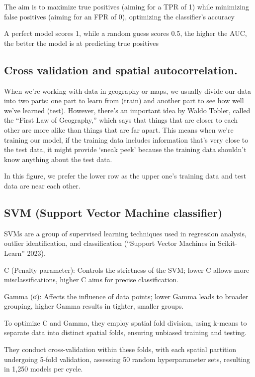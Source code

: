 \documentclass[
  letterpaper,
  DIV=11,
  numbers=noendperiod]{scrreprt}
\begin{document}
The aim is to maximize true positives (aiming for a TPR of 1) while
minimizing false positives (aiming for an FPR of 0), optimizing the
classifier's accuracy

A perfect model scores 1, while a random guess scores 0.5, the higher
the AUC, the better the model is at predicting true positives

\subsection{Cross validation and spatial
autocorrelation.}\label{cross-validation-and-spatial-autocorrelation.}

When we're working with data in geography or maps, we usually divide our
data into two parts: one part to learn from (train) and another part to
see how well we've learned (test). However, there's an important idea by
Waldo Tobler, called the ``First Law of Geography,'' which says that
things that are closer to each other are more alike than things that are
far apart. This means when we're training our model, if the training
data includes information that's very close to the test data, it might
provide `sneak peek' because the training data shouldn't know anything
about the test data.

In this figure, we prefer the lower row as the upper one's training data
and test data are near each other.

\subsection{SVM (Support Vector Machine
classifier)}\label{svm-support-vector-machine-classifier}

SVMs are a group of supervised learning techniques used in regression
analysis, outlier identification, and classification ({``Support Vector
Machines in Scikit-Learn''} 2023).~

C (Penalty parameter): Controls the strictness of the SVM; lower C
allows more misclassifications, higher C aims for precise
classification.

Gamma (σ): Affects the influence of data points; lower Gamma leads to
broader grouping, higher Gamma results in tighter, smaller groups.

To optimize C and Gamma, they employ spatial fold division, using
k-means to separate data into distinct spatial folds, ensuring unbiased
training and testing.

They conduct cross-validation within these folds, with each spatial
partition undergoing 5-fold validation, assessing 50 random
hyperparameter sets, resulting in 1,250 models per cycle.
\end{document}
